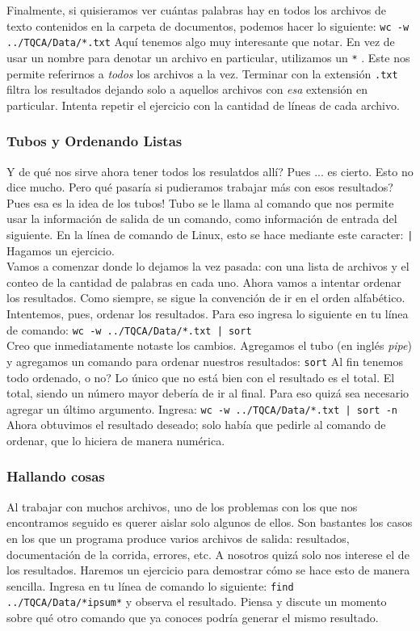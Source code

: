 \documentclass[10pt,letterpaper]{article}
\newcommand{\inlinecode}[1]{
\colorbox{light-gray}{\texttt{#1}}
}
\begin{document}
Finalmente, si quisieramos ver cu\'antas palabras hay en todos los archivos de texto contenidos en la carpeta de documentos, podemos hacer lo siguiente: \inlinecode{wc -w ../TQCA/Data/*.txt} Aqu\'i tenemos algo muy interesante que notar. En vez de usar un nombre para denotar un archivo en particular, utilizamos un \inlinecode{*}. Este nos permite referirnos a \emph{todos} los archivos a la vez. Terminar con la extensi\'on \inlinecode{.txt} filtra los resultados dejando solo a aquellos archivos con \emph{esa} extensi\'on en particular. Intenta repetir el ejercicio con la cantidad de l\'ineas de cada archivo.

\subsubsection{Tubos y Ordenando Listas}
Y de qu\'e nos sirve ahora tener todos los resulatdos all\'i? Pues ... es cierto. Esto no dice mucho. Pero qu\'e pasar\'ia si pudieramos trabajar m\'as con esos resultados? Pues esa es la idea de los tubos! Tubo se le llama al comando que nos permite usar la informaci\'on de salida de un comando, como informaci\'on de entrada del siguiente. En la l\'inea de comando de Linux, esto se hace mediante este caracter: \inlinecode{|} Hagamos un ejercicio.\\

Vamos a comenzar donde lo dejamos la vez pasada: con una lista de archivos y el conteo de la cantidad de palabras en cada uno. Ahora vamos a intentar ordenar los resultados. Como siempre, se sigue la convenci\'on de ir en el orden alfab\'etico. Intentemos, pues, ordenar los resultados. Para eso ingresa lo siguiente en tu l\'inea de comando: \inlinecode{wc -w ../TQCA/Data/*.txt | sort}\\

Creo que inmediatamente notaste los cambios. Agregamos el tubo (en ingl\'es \emph{pipe}) y agregamos un comando para ordenar nuestros resultados: \inlinecode{sort} Al fin tenemos todo ordenado, o no? Lo \'unico que no est\'a bien con el resultado es el total. El total, siendo un n\'umero mayor deber\'ia de ir al final. Para eso quiz\'a sea necesario agregar un \'ultimo argumento. Ingresa: \inlinecode{wc -w ../TQCA/Data/*.txt | sort -n} Ahora obtuvimos el resultado deseado; solo hab\'ia que pedirle al comando de ordenar, que lo hiciera de manera num\'erica.

\subsubsection{Hallando cosas}
Al trabajar con muchos archivos, uno de los problemas con los que nos encontramos seguido es querer aislar solo algunos de ellos. Son bastantes los casos en los que un programa produce varios archivos de salida: resultados, documentaci\'on de la corrida, errores, etc. A nosotros quiz\'a solo nos interese el de los resultados. Haremos un ejercicio para demostrar c\'omo se hace esto de manera sencilla. Ingresa en tu l\'inea de comando lo siguiente: \inlinecode{find ../TQCA/Data/*ipsum*} y observa el resultado. Piensa y discute un momento sobre qu\'e otro comando que ya conoces podr\'ia generar el mismo resultado.\\
\end{document}
